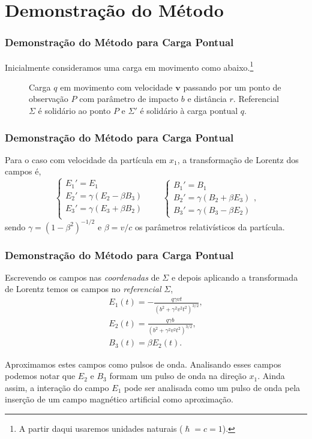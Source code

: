 \documentclass[xcolor=dvipsnames]{beamer}
\renewcommand{\vec}{\mathbf}
\begin{document}
\section{Demonstração do Método}

\begin{frame}
	\frametitle{Demonstração do Método para Carga Pontual}
	Inicialmente consideramos uma carga em movimento como abaixo.\footnote{A
	partir daqui usaremos unidades naturais ($\hslash = c = 1$).}
	\begin{figure}
	
	\caption{Carga $q$ em movimento com velocidade $\vec{v}$ passando por um
		ponto de observação $P$ com parâmetro de impacto $b$ e distância $r$.
		Referencial $\Sigma$ é solidário ao ponto $P$ e $\Sigma '$ é solidário
		à carga pontual $q$.}
	\end{figure}
\end{frame}


\begin{frame}
	\frametitle{Demonstração do Método para Carga Pontual}
	Para o caso com velocidade da partícula em $x_1$, a transformação de
	Lorentz dos campos é,
	\begin{equation}
		\label{eq_field_trans}
		\begin{cases}
		E_1' = E_1 \\
		E_2' = \gamma (E_2 - \beta B_3) \\
		E_3' = \gamma (E_3 + \beta B_2) \\
		\end{cases} \qquad
		\begin{cases}
		B_1 ' = B_1 \\
		B_2 ' = \gamma (B_2 + \beta E_3) \\
		B_3' = \gamma(B_3 - \beta E_2)
		\end{cases},
	\end{equation}
	sendo $\gamma = (1-\beta ^2)^{-1/2}$ e $\beta = v/c$ os parâmetros
	relativísticos da partícula.
\end{frame}


\begin{frame}
	\frametitle{Demonstração do Método para Carga Pontual}
	Escrevendo os campos nas \textit{coordenadas} de $\Sigma$ e depois
	aplicando a transformada de Lorentz temos os campos no \textit{referencial}
	$\Sigma$,
	\begin{gather}
		E_1 (t) = -\frac{q\gamma vt}{(b^2 + \gamma ^2 v^2t^2)^{3/2}}
			\label{eq_field1},\\
		E_2 (t) = \frac{q\gamma b}{(b^2 + \gamma ^2 v^2 t
			^2)^{3/2}}\label{eq_field2},\\ 
		B_3 (t) = \beta E_2(t) \label{eq_field3}.
	\end{gather}
	\begin{block}{Aproximamos estes campos como pulsos de onda.}
		Analisando esses campos podemos notar que $E_2$ e $B_3$ formam um pulso
		de onda na direção $x_1$. Ainda assim, a interação do campo $E_1$ pode
		ser analisada como um pulso de onda pela inserção de um campo magnético
		artificial como aproximação.
	\end{block}
\end{frame}
\end{document}

